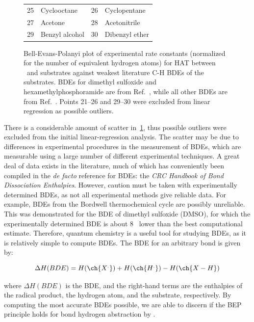 \begin{figure}[!htbp]
\begin{tabularx}{\textwidth}{| l X l X |}
  25 & Cyclooctane & 26 & Cyclopentane  \\
  27 & Acetone & 28 & Acetonitrile \\
  29 & Benzyl alcohol & 30 & Dibenzyl ether \\
  \hline
\end{tabularx}
  \caption[Bell-Evans-Polanyi plot of experimental rate constants against
  literature BDEs.]{Bell-Evans-Polanyi plot of experimental rate constants
  (normalized for the number of equivalent hydrogen atoms) for HAT between
  \cumo\ and substrates against weakest literature C-H BDEs of the substrates.
  BDEs for dimethyl sulfoxide and hexamethylphosphoramide are from
  Ref.~\protect{}, while all other BDEs are from
  Ref.~\protect{}. Points 21--26 and 29--30 were excluded from
  linear regression as possible outliers.}
  \label{fig:bep-expt}
\end{figure}

There is a considerable amount of scatter in~\ref{fig:bep-expt}, thus possible
outliers were excluded from the initial linear-regression analysis. The scatter
may be due to differences in experimental procedures in the measurement of
BDEs, which are measurable using a large number of different experimental
techniques. A great deal of data exists in the literature, much of which has
conveniently been compiled in the \emph{de facto} reference for BDEs: the
\emph{CRC Handbook of Bond Dissociation Enthalpies}.\cite{Luo2002} However,
caution must be taken with experimentally determined BDEs, as not all
experimental methods give reliable data. For example, BDEs from the
Bordwell\cite{Bordwell1988} thermochemical cycle are possibly
unreliable.\cite{Salamone2012, Miller2016} This was demonstrated for the BDE of
dimethyl sulfoxide (DMSO), for which the experimentally determined BDE is about
8 \kcalmol\ lower than the best computational estimate.\cite{Salamone2012}
Therefore, quantum chemistry is a useful tool for studying BDEs, as it is
relatively simple to compute BDEs. The BDE for an arbitrary  bond is
given by:

\begin{equation}
  \Delta H(BDE) =  H(\ch{X^.}) + H(\ch{H^.}) - H(\ch{X-H})
\end{equation}

\noindent where $\Delta H(BDE)$ is the BDE, and the right-hand terms are the
enthalpies of the radical product, the hydrogen atom, and the substrate,
respectively. By computing the most accurate BDEs possible, we are able to
discern if the BEP principle holds for  bond hydrogen abstraction by
\cumo.

